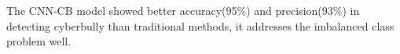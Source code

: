 The CNN-CB model showed better accuracy(95\%) and precision(93\%) in detecting cyberbully than traditional methods, it addresses the imbalanced class problem well.
